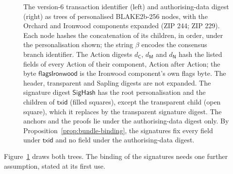 \documentclass[11pt,a4paper]{article}
\theoremstyle{definition}
\begin{document}
\begin{figure}[tp]
\caption{The version-$6$ transaction identifier (left) and authorising-data
digest (right) as trees of personalised BLAKE2b-256 nodes, with the Orchard
and Ironwood components expanded (ZIP 244; ZIP 229). Each node hashes the
concatenation of its children, in order, under the personalisation shown;
the string $\beta$ encodes the consensus branch identifier. The Action digests
$d_{\mathsf{C}}$, $d_{\mathsf{M}}$ and $d_{\mathsf{N}}$ hash the listed
fields of every Action of their component, Action after Action; the byte
$\mathsf{flagsIronwood}$ is the Ironwood component's own flags byte. The
header, transparent and Sapling digests are not expanded. The signature
digest $\mathsf{SigHash}$ has the root personalisation and the children of
$\mathsf{txid}$ (filled squares), except the transparent child (open
square), which it replaces by the transparent signature digest. The anchors
and the proofs lie under the authorising-data digest only. By
Proposition~\ref{prop:bundle-binding}, the signatures fix every field under
$\mathsf{txid}$ and no field under the authorising-data digest.}
\label{fig:sighash}
\end{figure}

Figure~\ref{fig:sighash} draws both trees. The binding of the signatures
needs one further assumption, stated at its first use.
\end{document}
